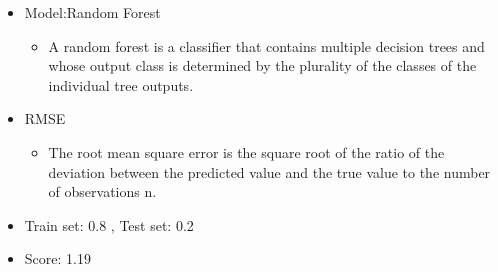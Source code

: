 \documentclass{tikzposter} %
\begin{document}
\begin{columns}
{}





{
  \begin{itemize}
    \item
    Model:Random Forest
    \begin{itemize}
      \item
      A random forest is a classifier that contains multiple decision trees and whose output class is
      determined by the plurality of the classes of the individual tree outputs.
    \end{itemize}
    \item
    RMSE
    \begin{itemize}
      \item
      The root mean square error is the square root of the ratio of the deviation between the predicted
      value and the true value to the number of observations n.
    \end{itemize}
    \item
    Train set: 0.8 , Test set: 0.2
    \item
    Score: 1.19
  \end{itemize}
}



\end{columns}
\end{document}
